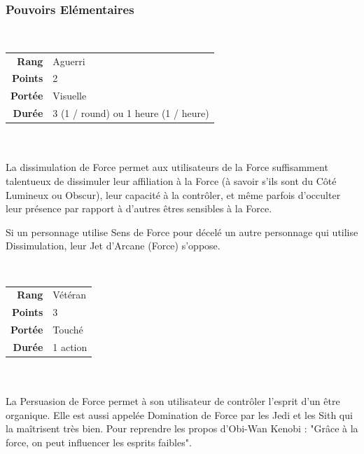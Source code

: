 \subsubsection{Pouvoirs \’Elémentaires}
\begin{description}[align=left] 

    \item [Dissimulation de Force] ~ \\

        \begin{tabular}{ r l }
            \textbf{Rang}    & Aguerri \\
            \textbf{Points}  & 2 \\
            \textbf{Portée}  & Visuelle \\
            \textbf{Durée}   & 3 (1 / round) ou 1 heure (1 / heure) \\
        \end{tabular}
        \\ \\
		La dissimulation de Force permet aux utilisateurs de la Force suffisamment talentueux de dissimuler leur affiliation à la Force (à savoir s’ils sont du Côté Lumineux ou Obscur), leur capacité à la contrôler, et même parfois d’occulter leur présence par rapport à d’autres êtres sensibles à la Force. 

		Si un personnage utilise Sens de Force pour décelé un autre personnage qui utilise Dissimulation, leur Jet d’Arcane (Force) s’oppose.
        \\

	\item [Persuasion de Force] ~ \\

        \begin{tabular}{ r l }
            \textbf{Rang}    & Vétéran \\
            \textbf{Points}  & 3 \\
            \textbf{Portée}  & Touché \\
            \textbf{Durée}   & 1 action \\
        \end{tabular}
        \\ \\
		La Persuasion de Force permet à son utilisateur de contrôler l’esprit d’un être organique. Elle est aussi appelée Domination de Force par les Jedi et les Sith qui la maîtrisent très bien. Pour reprendre les propos d’Obi-Wan Kenobi : "Grâce à la force, on peut influencer les esprits faibles". 


\end{description}
